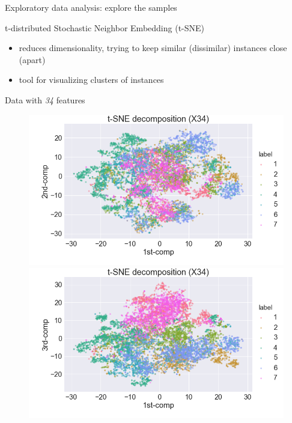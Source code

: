 \documentclass{if-beamer}
\begin{document}
 
\begin{frame}{Exploratory data analysis: explore the samples}
        \begin{block}{t-distributed Stochastic Neighbor Embedding (t-SNE)}    
        \begin{itemize}
                \item reduces dimensionality, trying to keep similar (dissimilar) instances close  (apart)
                \item tool for visualizing clusters of instances 
        \end{itemize}                 

         \begin{exampleblock}{Data with \emph{34} features}
            	 \begin{figure}
                    \includegraphics[scale=0.2]{./figs/tSNE12.png}
                    \includegraphics[scale=0.2]{./figs/tSNE13.png}
                    \end{figure} 
               \end{exampleblock}

   	 \end{block}
	
\end{frame}
\end{document}
